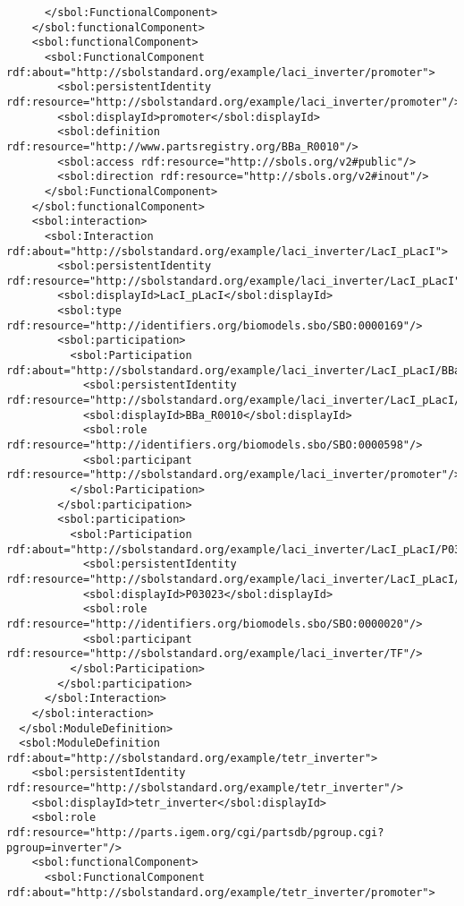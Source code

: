 \begin{lstlisting}
      </sbol:FunctionalComponent>
    </sbol:functionalComponent>
    <sbol:functionalComponent>
      <sbol:FunctionalComponent rdf:about="http://sbolstandard.org/example/laci_inverter/promoter">
        <sbol:persistentIdentity rdf:resource="http://sbolstandard.org/example/laci_inverter/promoter"/>
        <sbol:displayId>promoter</sbol:displayId>
        <sbol:definition rdf:resource="http://www.partsregistry.org/BBa_R0010"/>
        <sbol:access rdf:resource="http://sbols.org/v2#public"/>
        <sbol:direction rdf:resource="http://sbols.org/v2#inout"/>
      </sbol:FunctionalComponent>
    </sbol:functionalComponent>
    <sbol:interaction>
      <sbol:Interaction rdf:about="http://sbolstandard.org/example/laci_inverter/LacI_pLacI">
        <sbol:persistentIdentity rdf:resource="http://sbolstandard.org/example/laci_inverter/LacI_pLacI"/>
        <sbol:displayId>LacI_pLacI</sbol:displayId>
        <sbol:type rdf:resource="http://identifiers.org/biomodels.sbo/SBO:0000169"/>
        <sbol:participation>
          <sbol:Participation rdf:about="http://sbolstandard.org/example/laci_inverter/LacI_pLacI/BBa_R0010">
            <sbol:persistentIdentity rdf:resource="http://sbolstandard.org/example/laci_inverter/LacI_pLacI/BBa_R0010"/>
            <sbol:displayId>BBa_R0010</sbol:displayId>
            <sbol:role rdf:resource="http://identifiers.org/biomodels.sbo/SBO:0000598"/>
            <sbol:participant rdf:resource="http://sbolstandard.org/example/laci_inverter/promoter"/>
          </sbol:Participation>
        </sbol:participation>
        <sbol:participation>
          <sbol:Participation rdf:about="http://sbolstandard.org/example/laci_inverter/LacI_pLacI/P03023">
            <sbol:persistentIdentity rdf:resource="http://sbolstandard.org/example/laci_inverter/LacI_pLacI/P03023"/>
            <sbol:displayId>P03023</sbol:displayId>
            <sbol:role rdf:resource="http://identifiers.org/biomodels.sbo/SBO:0000020"/>
            <sbol:participant rdf:resource="http://sbolstandard.org/example/laci_inverter/TF"/>
          </sbol:Participation>
        </sbol:participation>
      </sbol:Interaction>
    </sbol:interaction>
  </sbol:ModuleDefinition>
  <sbol:ModuleDefinition rdf:about="http://sbolstandard.org/example/tetr_inverter">
    <sbol:persistentIdentity rdf:resource="http://sbolstandard.org/example/tetr_inverter"/>
    <sbol:displayId>tetr_inverter</sbol:displayId>
    <sbol:role rdf:resource="http://parts.igem.org/cgi/partsdb/pgroup.cgi?pgroup=inverter"/>
    <sbol:functionalComponent>
      <sbol:FunctionalComponent rdf:about="http://sbolstandard.org/example/tetr_inverter/promoter">

\end{lstlisting}

